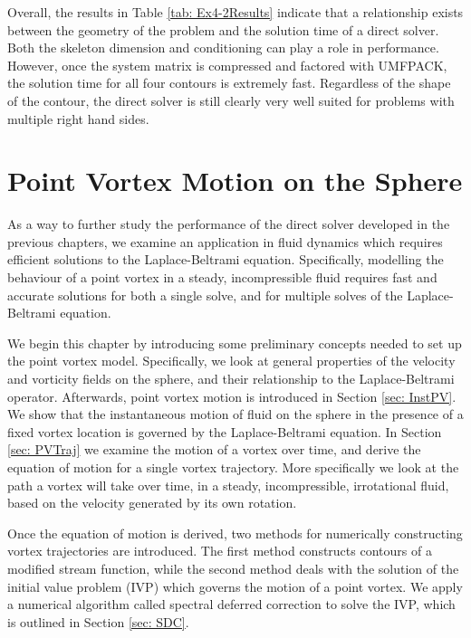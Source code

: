 \documentclass{sfuthesis}
\begin{document}
Overall, the results in Table \ref{tab: Ex4-2Results} indicate that a relationship exists between the geometry of the problem and the solution time of a direct solver. Both the skeleton dimension and conditioning can play a role in performance.  However, once the system matrix is compressed and factored with UMFPACK, the solution time for all four contours is extremely fast. Regardless of the shape of the contour, the direct solver is still clearly very well suited for problems with multiple right hand sides. 

\chapter{Point Vortex Motion on the Sphere}
\label{five}

As a way to further study the performance of the direct solver developed in the previous chapters, we examine an application in fluid dynamics which requires efficient solutions to the Laplace-Beltrami equation. Specifically, modelling the behaviour of a point vortex in a steady, incompressible fluid requires fast and accurate solutions for both a single solve, and for multiple solves of the Laplace-Beltrami equation. 
 
We begin this chapter by introducing some preliminary concepts needed to set up the point vortex model. Specifically, we look at general properties of the velocity and vorticity fields on the sphere, and their relationship to the Laplace-Beltrami operator. Afterwards, point vortex motion is introduced in Section \ref{sec: InstPV}. We show that the instantaneous motion of fluid on the sphere in the presence of a fixed vortex location is governed by the Laplace-Beltrami equation. In Section \ref{sec: PVTraj} we examine the motion of a vortex over time, and derive the equation of motion for a single vortex trajectory. More specifically we look at the path a vortex will take over time, in a steady, incompressible, irrotational fluid, based on the velocity generated by its own rotation.

Once the equation of motion is derived, two methods for numerically constructing vortex trajectories are introduced. The first method constructs contours of a modified stream function, while the second method deals with the solution of the initial value problem (IVP) which governs the motion of a point vortex. We apply a numerical algorithm called spectral deferred correction to solve the IVP, which is outlined in Section \ref{sec: SDC}. 
\end{document}
